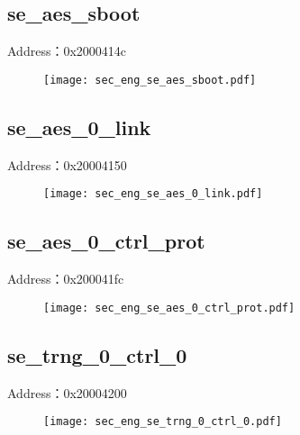 \subsection{se\_aes\_sboot}
\label{sec_eng-se-aes-sboot}
Address：0x2000414c
 \begin{figure}[H]
\texttt{[image: sec\_eng\_se\_aes\_sboot.pdf]}
\end{figure}

\subsection{se\_aes\_0\_link}
\label{sec_eng-se-aes-0-link}
Address：0x20004150
 \begin{figure}[H]
\texttt{[image: sec\_eng\_se\_aes\_0\_link.pdf]}
\end{figure}

\subsection{se\_aes\_0\_ctrl\_prot}
\label{sec_eng-se-aes-0-ctrl-prot}
Address：0x200041fc
 \begin{figure}[H]
\texttt{[image: sec\_eng\_se\_aes\_0\_ctrl\_prot.pdf]}
\end{figure}

\subsection{se\_trng\_0\_ctrl\_0}
\label{sec_eng-se-trng-0-ctrl-0}
Address：0x20004200
 \begin{figure}[H]
\texttt{[image: sec\_eng\_se\_trng\_0\_ctrl\_0.pdf]}
\end{figure}


